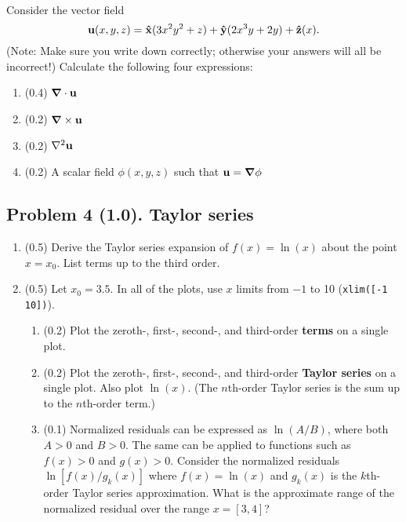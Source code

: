 \documentclass[11pt,titlepage,fleqn]{article}
\begin{document}
\citep[][p.~473, P13]{SteinWysession} \\
Consider the vector field
%
\begin{equation}
\mbox{${\bf u}$}(x,y,z) = \mbox{\boldmath{$\hat{\rm x}$}}(3x^2y^2 + z) + \mbox{\boldmath{$\hat{\rm y}$}}(2x^3y+2y) + \mbox{\boldmath{$\hat{\rm z}$}}(x).
\label{vec}
\end{equation}
%
(Note: Make sure you write down  correctly; otherwise your answers will all be incorrect!) Calculate the following four expressions:
%
\begin{enumerate}
\item (0.4) $\mbox{\boldmath $\nabla$} \cdot \mbox{${\bf u}$}$
\item (0.2) $\mbox{\boldmath $\nabla$} \times \mbox{${\bf u}$}$
\item (0.2) $\nabla^2\mbox{${\bf u}$}$
\item (0.2) A scalar field $\phi(x,y,z)$ such that $\mbox{${\bf u}$}=\mbox{\boldmath $\nabla$}\phi$
\end{enumerate}


\subsection*{Problem 4 (1.0). Taylor series}

\begin{enumerate}
\item (0.5) Derive the Taylor series expansion of $f(x) = \ln(x)$ about the point $x = x_0$. List terms up to the third order.

\item (0.5) Let $x_0 = 3.5$. In all of the plots, use $x$ limits from $-1$ to 10 (\verb+xlim([-1 10])+).
%
\begin{enumerate}
\item (0.2) Plot the zeroth-, first-, second-, and third-order {\bf terms} on a single plot.

\item (0.2) Plot the zeroth-, first-, second-, and third-order {\bf Taylor series} on a single plot. Also plot $\ln(x)$.
(The $n$th-order Taylor series is the sum up to the $n$th-order term.) 

\item (0.1) Normalized residuals can be expressed as $\ln(A/B)$, where both $A > 0$ and $B > 0$.
The same can be applied to functions such as $f(x) > 0$ and $g(x) > 0$.
Consider the normalized residuals $\ln[ f(x) / g_k(x) ]$ where $f(x) = \ln(x)$ and $g_k(x)$ is the $k$th-order Taylor series approximation. What is the approximate range of the normalized residual over the range $x = [3,4]$?
\end{enumerate}

\end{enumerate}
\end{document}
